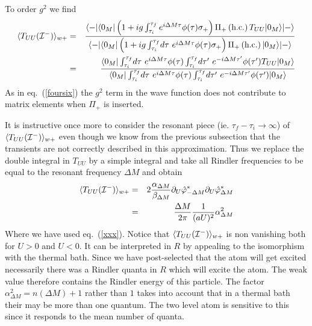 \documentclass[12pt,oneside]{report}
\def\ket#1{|#1\rangle}
\def\bra#1{\langle #1|}
\def\elematrice#1#2#3{\langle #1|#2|#3 \rangle}
\begin{document}
To order $g^2$ we find
 \begin{eqnarray}
\langle T_{UU}({\cal{I^-}}) \rangle_{w+} &=&  
{ 
\bra{-} 
\elematrice{0_M}{
\left( 1 + i g \int_{\tau_i}^{\tau_f}
e^{i\Delta M \tau} \phi(\tau) \sigma_+ \right) \Pi_+\left(
\hbox{h.c.} \right) T_{UU}
}{0_M} 
\ket{-}
\over  
\bra{-} 
\elematrice{0_M}{
\left( 1 + i g \int_{\tau_i}^{\tau_f}\! d \tau\ 
e^{i\Delta M \tau} \phi(\tau) \sigma_+ \right) \Pi_+\left(
\hbox{h.c.} \right) 
}{0_M} 
\ket{-} }
\nonumber
\\
&=& {  
\elematrice{0_M}{  
\int_{\tau_i}^{\tau_f}\! d\tau\ 
e^{i\Delta M \tau} \phi(\tau)  
\int_{\tau_i}^{\tau_f}\! d\tau^\prime\  
e^{-i\Delta M \tau^\prime} \phi(\tau^\prime) 
T_{UU}
}{0_M} 
\over 
\elematrice{0_M}{  \int_{\tau_i}^{\tau_f}\! d\tau\ 
e^{i\Delta M \tau} \phi(\tau) 
\int_{\tau_i}^{\tau_f}\! d\tau^\prime\  
e^{-i\Delta M \tau^\prime} \phi(\tau^\prime) 
}{0_M} } \label{weight}
\end{eqnarray}
As in eq.~(\ref{foursix}) the $g^2$ term in the wave function does not
contribute to matrix elements when $\Pi_+$ is inserted.



It is instructive once more to consider 
the resonant piece (ie. $\tau_f -\tau_i \to \infty$) of 
$\langle T_{UU}({\cal{I^-}}) \rangle_{w+}$
 even though we know from the previous subsection that the transients
are not correctly described in this approximation. 
Thus we replace the double integral in $T_{UU}$ by a simple integral and
take all Rindler frequencies to be equal to the resonant frequency
$\Delta M$ and obtain 
\begin{eqnarray}
\langle T_{UU} ({\cal{I^-}})\rangle_{w+} &=&  2{\alpha_{\Delta M}\over \beta_{\Delta M}}
\partial_U \hat  \varphi^*_{-\Delta M}
\partial_U \hat  \varphi^*_{\Delta M} \nonumber\\
 &=& 
{\Delta M \over 2 \pi}{1 \over (aU)^2} \alpha_{\Delta M}^2
\label{woneone}
\end{eqnarray}
Where we have used eq.~(\ref{xxx}). 
Notice that $\langle T_{UU}({\cal{I^-}})\rangle_{w +}$ is non vanishing both for $U>0$ and
$U<0$. 
It can be interpreted in $R$ by appealing to the
isomorphism with the thermal bath. Since we have post-selected that the
atom will get excited  necessarily there was a Rindler quanta in $R$ which will 
excite the atom. The weak value therefore contains the Rindler energy of this
particle. The factor $\alpha_{\Delta M}^2= n(\Delta M) + 1$ rather than $1$
takes into account that in a thermal bath their may be more than one quantum.
The two level atom is sensitive to this since it responds to the 
 mean number of quanta.
\end{document}
